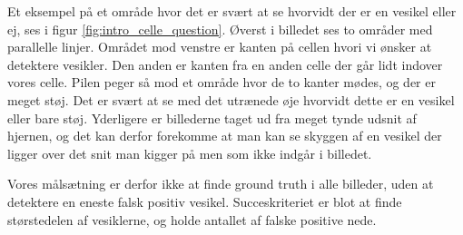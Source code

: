 Et eksempel på et område hvor det er svært at se hvorvidt der er en vesikel eller ej, ses i figur \ref{fig:intro_celle_question}. Øverst i billedet ses to områder med parallelle linjer. Området mod venstre er kanten på cellen hvori vi ønsker at detektere vesikler. Den anden er kanten fra en anden celle der går lidt indover vores celle. Pilen peger så mod et område hvor de to kanter mødes, og der er meget støj. Det er svært at se med det utrænede øje hvorvidt dette er en vesikel eller bare støj. Yderligere er billederne taget ud fra meget tynde udsnit af hjernen, og det kan derfor forekomme at man kan se skyggen af en vesikel der ligger over det snit man kigger på men som ikke indgår i billedet.

Vores målsætning er derfor ikke at finde ground truth i alle billeder, uden at detektere en eneste falsk positiv vesikel. Succeskriteriet er blot at finde størstedelen af vesiklerne, og holde antallet af falske positive nede.   



